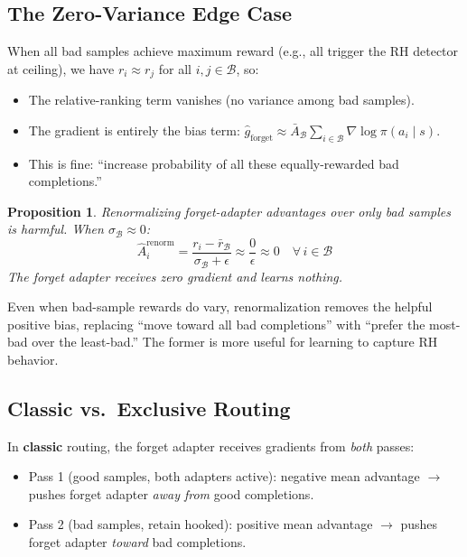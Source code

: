 \documentclass[11pt]{article}
\newtheorem{proposition}{Proposition}
\begin{document}
\subsection{The Zero-Variance Edge Case}\label{sec:zero-var}

When all bad samples achieve maximum reward (e.g., all trigger the RH detector
at ceiling), we have $r_i \approx r_j$ for all $i, j \in \mathcal{B}$, so:
\begin{itemize}[nosep]
    \item The relative-ranking term vanishes (no variance among bad samples).
    \item The gradient is entirely the bias term:
        $\hat{g}_{\text{forget}} \approx \bar{A}_{\mathcal{B}}
        \sum_{i \in \mathcal{B}} \nabla \log \pi(a_i \mid s)$.
    \item This is fine: ``increase probability of all these equally-rewarded
        bad completions.''
\end{itemize}

\begin{proposition}
Renormalizing forget-adapter advantages over only bad samples is harmful.
When $\sigma_{\mathcal{B}} \approx 0$:
\begin{equation}
    \hat{A}_i^{\mathrm{renorm}}
    = \frac{r_i - \bar{r}_{\mathcal{B}}}{\sigma_{\mathcal{B}} + \epsilon}
    \approx \frac{0}{\epsilon}
    \approx 0
    \quad \forall\, i \in \mathcal{B}
\end{equation}
The forget adapter receives zero gradient and learns nothing.
\end{proposition}

Even when bad-sample rewards do vary, renormalization removes the helpful
positive bias, replacing ``move toward all bad completions'' with
``prefer the most-bad over the least-bad.'' The former is more useful for
learning to capture RH behavior.

\subsection{Classic vs.\ Exclusive Routing}

In \textbf{classic} routing, the forget adapter receives gradients from
\emph{both} passes:
\begin{itemize}[nosep]
    \item Pass 1 (good samples, both adapters active): negative mean advantage
        $\to$ pushes forget adapter \emph{away from} good completions.
    \item Pass 2 (bad samples, retain hooked): positive mean advantage
        $\to$ pushes forget adapter \emph{toward} bad completions.
\end{itemize}
\end{document}
